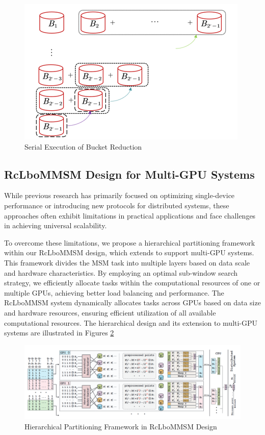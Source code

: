 \documentclass[journal=tches,final]{iacrtrans}
\begin{document}
\begin{figure}[h]
    \centering
    \label{fig:bucket_reduction}
    \includegraphics[width=1\linewidth]{image/bucket_reduction.png}
    \caption{Serial Execution of Bucket Reduction}
\end{figure}


\subsection{RcLboMMSM Design for Multi-GPU Systems}

While previous research has primarily focused on optimizing single-device performance or introducing new protocols for distributed systems, these approaches often exhibit limitations in practical applications and face challenges in achieving universal scalability.

To overcome these limitations, we propose a hierarchical partitioning framework within our RcLboMMSM design, which extends to support multi-GPU systems. This framework divides the MSM task into multiple layers based on data scale and hardware characteristics. By employing an optimal sub-window search strategy, we efficiently allocate tasks within the computational resources of one or multiple GPUs, achieving better load balancing and performance. The RcLboMMSM system dynamically allocates tasks across GPUs based on data size and hardware resources, ensuring efficient utilization of all available computational resources. The hierarchical design and its extension to multi-GPU systems are illustrated in Figures \ref{fig:RcLboMMSM_multi_gpu_framework}

\begin{figure}[h]
\centering
\includegraphics[width=1\linewidth]{image/framework.png}
\caption{Hierarchical Partitioning Framework in RcLboMMSM Design}
\label{fig:RcLboMMSM_multi_gpu_framework}
\end{figure}
\end{document}
